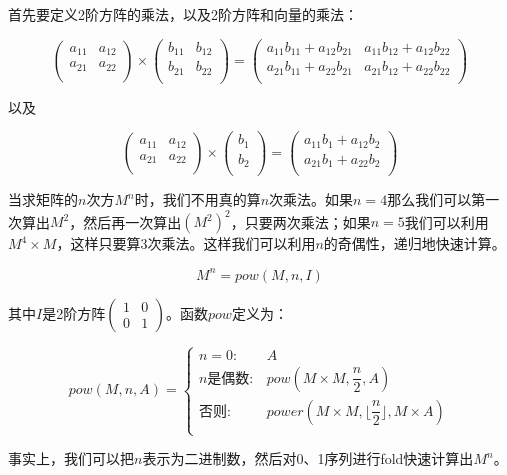 \documentclass[UTF8]{article}
\begin{document}
\begin{enumerate}
首先要定义2阶方阵的乘法，以及2阶方阵和向量的乘法：

\[
\begin{pmatrix}
a_{11} & a_{12} \\
a_{21} & a_{22} \\
\end{pmatrix}
\times
\begin{pmatrix}
b_{11} & b_{12} \\
b_{21} & b_{22} \\
\end{pmatrix}
=
\begin{pmatrix}
a_{11} b_{11} + a_{12} b_{21} & a_{11} b_{12} + a_{12} b_{22} \\
a_{21} b_{11} + a_{22} b_{21} & a_{21} b_{12} + a_{22} b_{22} \\
\end{pmatrix}
\]

以及

\[
\begin{pmatrix}
a_{11} & a_{12} \\
a_{21} & a_{22} \\
\end{pmatrix}
\times
\begin{pmatrix}
b_{1} \\
b_{2} \\
\end{pmatrix}
=
\begin{pmatrix}
a_{11} b_{1} + a_{12} b_{2} \\
a_{21} b_{1} + a_{22} b_{2} \\
\end{pmatrix}
\]

当求矩阵的$n$次方$M^n$时，我们不用真的算$n$次乘法。如果$n=4$那么我们可以第一次算出$M^2$，然后再一次算出$(M^2)^2$，只要两次乘法；如果$n = 5$我们可以利用$M^4 \times M$，这样只要算3次乘法。这样我们可以利用$n$的奇偶性，递归地快速计算。

\[
M^n = pow(M, n, I)
\]

其中$I$是2阶方阵$\displaystyle \begin{pmatrix} 1 & 0 \\ 0 & 1\end{pmatrix}$。函数$pow$定义为：

\[
pow(M, n, A) = \begin{cases}
n = 0: & A \\
n\text{是偶数}: & pow(M \times M, \dfrac{n}{2}, A) \\
\text{否则}: & power(M \times M, \lfloor \dfrac{n}{2} \rfloor, M \times A)\\
\end{cases}
\]

事实上，我们可以把$n$表示为二进制数，然后对0、1序列进行fold快速计算出$M^n$。

\end{enumerate}
\end{document}

